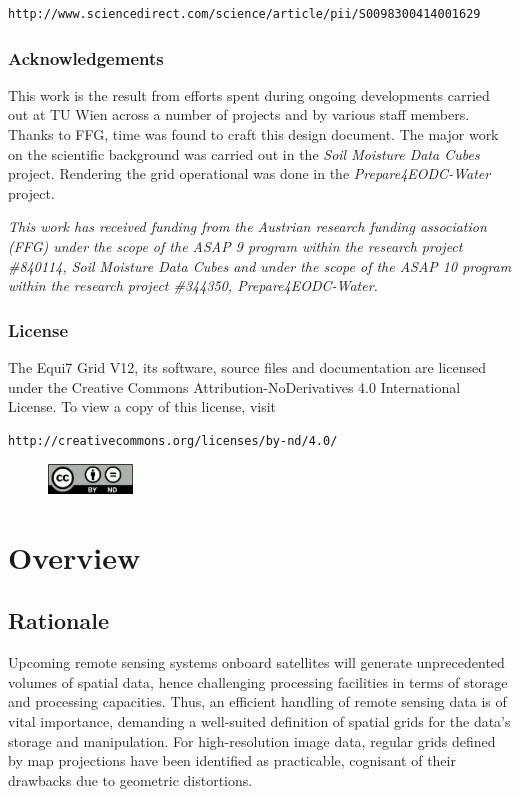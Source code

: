 \documentclass[11pt,a4paper]{article}
\begin{document}
\begin{lstlisting}
http://www.sciencedirect.com/science/article/pii/S0098300414001629
\end{lstlisting}

\subsubsection*{Acknowledgements}
This work is the result from efforts spent during ongoing developments carried out at TU Wien across a number of projects and by various staff members. Thanks to FFG, time was found to craft this design document. The major work on the scientific background was carried out in the \textit{Soil Moisture Data Cubes} project. Rendering the grid operational was done in the \textit{Prepare4EODC-Water} project.

\textit{This work has received funding from the Austrian research funding association (FFG) under the scope of the ASAP 9 program within the research project \#840114, Soil Moisture Data Cubes and under the scope of the ASAP 10 program within the research project \#344350, Prepare4EODC-Water.}

\subsubsection*{License}
The Equi7 Grid V12, its software, source files and documentation are licensed under the Creative Commons Attribution-NoDerivatives 4.0 International License. To view a copy of this license, visit

\begin{lstlisting}
http://creativecommons.org/licenses/by-nd/4.0/
\end{lstlisting}

\begin{figure}[hbtp]
\centering
\includegraphics[width=0.2\textwidth]{cc_by-nd}
\end{figure}

\newpage

\parskip 10pt

\section{Overview}
\label{sec:overview}

\subsection{Rationale}
Upcoming remote sensing systems onboard satellites will generate unprecedented volumes of spatial data, hence challenging processing facilities in terms of storage and processing capacities. Thus, an efficient handling of remote sensing data is of vital importance, demanding a well-suited definition of spatial grids for the data's storage and manipulation. For high-resolution image data, regular grids defined by map projections have been identified as practicable, cognisant of their drawbacks due to geometric distortions. 
\end{document}
